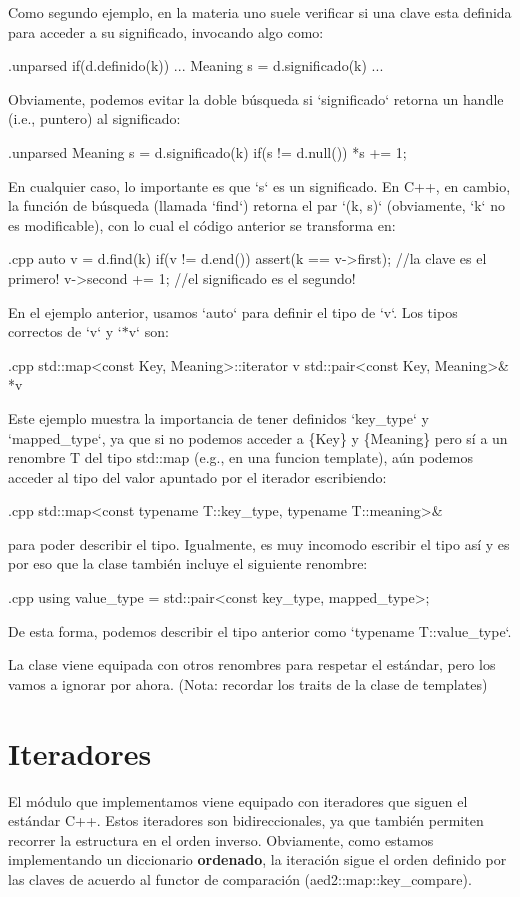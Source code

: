 \-Como segundo ejemplo, en la materia uno suele verificar si una clave esta definida para acceder a su significado, invocando algo como\-: 
\begin{DoxyCode}
 {.unparsed}
 if(d.definido(k)) { ... Meaning s = d.significado(k) ... }
\end{DoxyCode}
 \-Obviamente, podemos evitar la doble búsqueda si `significado` retorna un handle (i.\-e., puntero) al significado\-: 
\begin{DoxyCode}
 {.unparsed}
 Meaning s = d.significado(k)
 if(s != d.null()) { *s += 1; }
\end{DoxyCode}
 \-En cualquier caso, lo importante es que `s` es un significado. \-En \-C++, en cambio, la función de búsqueda (llamada `find`) retorna el par `(k, s)` (obviamente, `k` no es modificable), con lo cual el código anterior se transforma en\-: 
\begin{DoxyCode}
 {.cpp}
 auto v = d.find(k)
 if(v != d.end()) {
    assert(k == v->first); //la clave es el primero!
    v->second += 1;        //el significado es el segundo!
 }
\end{DoxyCode}


\-En el ejemplo anterior, usamos `auto` para definir el tipo de `v`. \-Los tipos correctos de `v` y `$\ast$v` son\-: 
\begin{DoxyCode}
 {.cpp}
 std::map<const Key, Meaning>::iterator v
 std::pair<const Key, Meaning>& *v
\end{DoxyCode}
 \-Este ejemplo muestra la importancia de tener definidos `key\-\_\-type` y `mapped\-\_\-type`, ya que si no podemos acceder a \{\-Key\} y \{\-Meaning\} pero sí a un renombre \-T del tipo std\-::map (e.\-g., en una funcion template), aún podemos acceder al tipo del valor apuntado por el iterador escribiendo\-: 
\begin{DoxyCode}
 {.cpp}
 std::map<const typename T::key_type, typename T::meaning>&
\end{DoxyCode}
 para poder describir el tipo. \-Igualmente, es muy incomodo escribir el tipo así y es por eso que la clase también incluye el siguiente renombre\-: 
\begin{DoxyCode}
 {.cpp}
 using value_type = std::pair<const key_type, mapped_type>;
\end{DoxyCode}
 \-De esta forma, podemos describir el tipo anterior como `typename \-T\-::value\-\_\-type`.

\-La clase viene equipada con otros renombres para respetar el estándar, pero los vamos a ignorar por ahora. (\-Nota\-: recordar los traits de la clase de templates)\hypertarget{Interfaz_Iteradores}{}\section{\-Iteradores}\label{Interfaz_Iteradores}
\-El módulo que implementamos viene equipado con iteradores que siguen el estándar \-C++. \-Estos iteradores son bidireccionales, ya que también permiten recorrer la estructura en el orden inverso. \-Obviamente, como estamos implementando un diccionario {\bfseries ordenado}, la iteración sigue el orden definido por las claves de acuerdo al functor de comparación (aed2\-::map\-::key\-\_\-compare).

